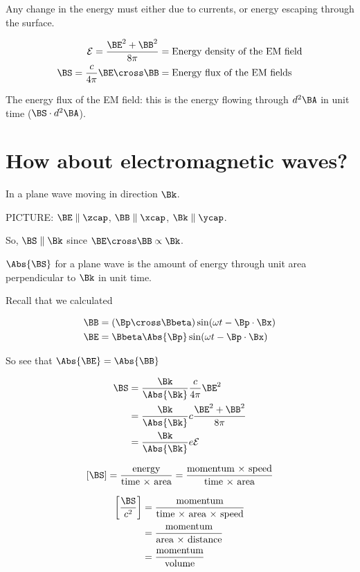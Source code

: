 Any change in the energy must either due to currents, or energy escaping through the surface.

\begin{align}\label{eqn:relativisticElectrodynamicsL17:70}
\mathcal{E} = \frac{\BE^2 + \BB^2 }{8 \pi} &= \mbox{Energy density of the EM field} \\
\BS = \frac{c}{4 \pi} \BE \cross \BB &= \mbox{Energy flux of the EM fields}
\end{align}

The energy flux of the EM field: this is the energy flowing through $d^2 \BA$ in unit time ($\BS \cdot d^2 \BA$).

\section{How about electromagnetic waves?}

In a plane wave moving in direction $\Bk$. 

PICTURE: $\BE \parallel \zcap$, $\BB \parallel \xcap$, $\Bk \parallel \ycap$.

So, $\BS \parallel \Bk$ since $\BE \cross \BB \propto \Bk$.

$\Abs{\BS}$ for a plane wave is the amount of energy through unit area perpendicular to $\Bk$ in unit time.

Recall that we calculated

\begin{align}\label{eqn:relativisticElectrodynamicsL17:90}
\BB &= (\Bp \cross \Bbeta) \sin(\omega t - \Bp \cdot \Bx) \\
\BE &= \Bbeta \Abs{\Bp} \sin(\omega t - \Bp \cdot \Bx)
\end{align}

So see that $\Abs{\BE} = \Abs{\BB}$

\begin{align*}
\BS 
&= \frac{\Bk}{\Abs{\Bk}} \frac{c}{4 \pi} \BE^2  \\
&= \frac{\Bk}{\Abs{\Bk}} c \frac{\BE^2 + \BB^2}{8 \pi} \\
&= \frac{\Bk}{\Abs{\Bk}} e \mathcal{E}
\end{align*}

\begin{equation}\label{eqn:relativisticElectrodynamicsL17:110}
[\BS] = \frac{\text{energy}}{\text{time $\times$ area}} = \frac{\text{momentum $\times$ speed}}{\text{time $\times$ area}}
\end{equation}

\begin{align*}
\left[\frac{\BS}{c^2} \right] 
&= \frac{\text{momentum}}{\text{time $\times$ area $\times$ speed}} \\
&= \frac{\text{momentum}}{\text{area $\times$ distance}} \\
&= \frac{\text{momentum}}{\text{volume}} \\
\end{align*}

